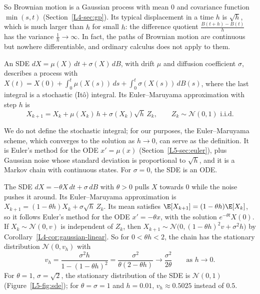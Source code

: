 So Brownian motion is a Gaussian process with mean $0$ and covariance function $\min(s, t)$ (Section~\ref{L4-sec:gp}). Its typical displacement in a time $h$ is $\sqrt{h}$, which is much larger than $h$ for small $h$: the difference quotient $\frac{B(t + h) - B(t)}{h}$ has the variance $\frac{1}{h} \to \infty$. In fact, the paths of Brownian motion are continuous but nowhere differentiable, and ordinary calculus does not apply to them.

\begin{definition}\label{L5-def:sde}
    An SDE $dX = \mu(X)\,dt + \sigma(X)\,dB$, with drift $\mu$ and diffusion coefficient $\sigma$, describes a process with $X(t) = X(0) + \int_0^t \mu(X(s))\, ds + \int_0^t \sigma(X(s))\, dB(s)$, where the last integral is a stochastic (It\^o) integral. Its Euler--Maruyama approximation with step $h$ is
    \[X_{k+1} = X_k + \mu(X_k)\,h + \sigma(X_k)\sqrt{h}\,Z_k, \qquad Z_k \sim \mathcal{N}(0, 1) \text{ i.i.d.}\]
\end{definition}

We do not define the stochastic integral; for our purposes, the Euler--Maruyama scheme, which converges to the solution as $h \to 0$, can serve as the definition. It is Euler's method for the ODE $x' = \mu(x)$ (Section~\ref{L5-sec:euler}), plus Gaussian noise whose standard deviation is proportional to $\sqrt{h}$, and it is a Markov chain with continuous states. For $\sigma = 0$, the SDE is an ODE.

\begin{example}\label{L5-ex:ou}
    The SDE $dX = -\theta X\,dt + \sigma\,dB$ with $\theta > 0$ pulls $X$ towards $0$ while the noise pushes it around. Its Euler--Maruyama approximation is $X_{k+1} = (1 - \theta h)X_k + \sigma\sqrt{h}\,Z_k$. Its mean satisfies $\E[X_{k+1}] = (1 - \theta h)\E[X_k]$, so it follows Euler's method for the ODE $x' = -\theta x$, with the solution $e^{-\theta t}X(0)$. If $X_k \sim \mathcal{N}(0, v)$ is independent of $Z_k$, then $X_{k+1} \sim \mathcal{N}\big(0, (1 - \theta h)^2v + \sigma^2h\big)$ by Corollary~\ref{L4-cor:gaussian-linear}. So for $0 < \theta h < 2$, the chain has the stationary distribution $\mathcal{N}(0, v_h)$ with
    \[v_h = \frac{\sigma^2h}{1 - (1 - \theta h)^2} = \frac{\sigma^2}{\theta(2 - \theta h)} \to \frac{\sigma^2}{2\theta} \qquad \text{as } h \to 0.\]
    For $\theta = 1$, $\sigma = \sqrt{2}$, the stationary distribution of the SDE is $\mathcal{N}(0, 1)$ (Figure~\ref{L5-fig:sde}); for $\theta = \sigma = 1$ and $h = 0.01$, $v_h \approx 0.5025$ instead of $0.5$.
\end{example}

